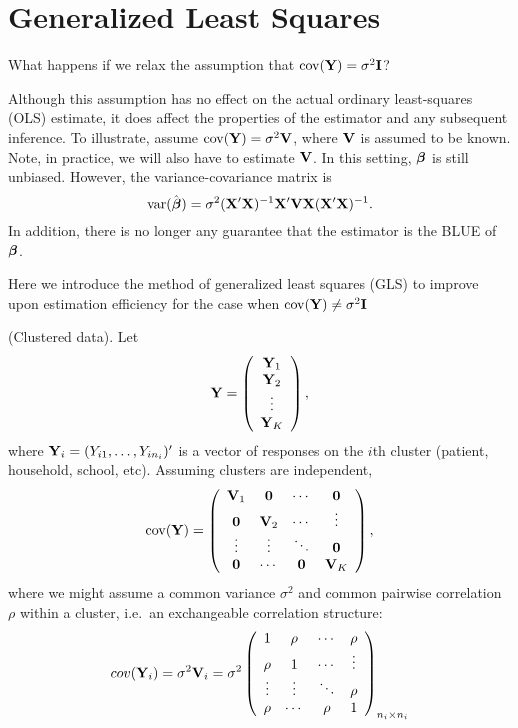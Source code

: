 \section{Generalized Least Squares}

\vb

What happens if we relax the assumption that $\mathrm{cov}(\mathbf{Y}) =
\sigma^2\mathbf{I}$?

Although this assumption has no effect on the actual ordinary least-squares (OLS) estimate, it does affect the properties of the estimator and any subsequent inference. To illustrate, assume $\mathrm{cov}(\mathbf{Y})=\sigma^2 \mathbf{V}$, where $\mathbf{V}$ is assumed to be  known. Note, in practice, we will also have to estimate $\mathbf{V}$. In this setting, $\mbox{\boldmath $\beta$}$ is still unbiased. However,  the variance-covariance matrix is
$$
\mathrm{var}({\hat {\mbox{\boldmath $\beta$}}}) = \sigma^2 (\mathbf{X}' \mathbf{X})^{-1} \mathbf{X}' \mathbf{V} \mathbf{X} (\mathbf{X}' \mathbf{X})^{-1}.
$$
In addition, there is no longer any guarantee that the estimator is the BLUE of $\mbox{\boldmath $\beta$}$.

\vb
Here we introduce the method of generalized least squares (GLS) to improve upon estimation efficiency for the case when $\mathrm{cov}(\mathbf{Y}) \neq \sigma^2\mathbf{I}$


\bexa
(Clustered data). Let
$$
\mathbf{Y}=\left(\begin{array}{c}
	\mathbf{Y}_1 \\ \mathbf{Y}_2 \\ \vdots \\ \mathbf{Y}_K
\end{array}\right),
$$
where $\mathbf{Y}_i=(Y_{i1},\ldots,Y_{in_i})'$ is a vector of responses on
the $i$th cluster (patient, household, school, etc).  Assuming
clusters are independent,
$$
\mathrm{cov}(\mathbf{Y})=\left(\begin{array}{cccc}
	\mathbf{V}_1 & \mathbf{0} & \cdots & \mathbf{0} \\
	\mathbf{0} & \mathbf{V}_2 & \cdots & \vdots \\
	\vdots & \vdots & \ddots & \mathbf{0} \\
	\mathbf{0} & \cdots & \mathbf{0} & \mathbf{V}_K
\end{array}\right),
$$
where we might assume a common variance $\sigma^2$ and common pairwise
correlation $\rho$ within a cluster, i.e.~an exchangeable correlation
structure:
$$
cov(\mathbf{Y}_i)=\sigma^2\mathbf{V}_i=\sigma^2 \left(\begin{array}{cccc}
        1 & \rho  & \cdots & \rho  \\
        \rho & 1 & \cdots & \vdots \\
        \vdots & \vdots & \ddots & \rho \\
        \rho & \cdots & \rho & 1
\end{array}\right)_{n_i\times n_i}
$$
\eexa


